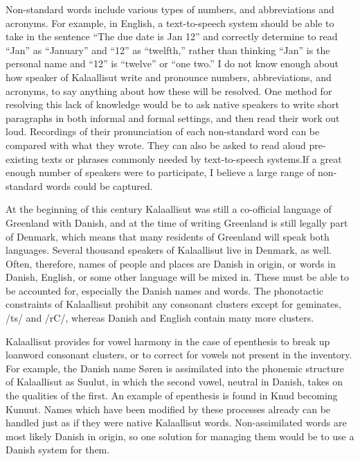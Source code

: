 \documentclass[12pt]{article}
\begin{document}
	Non-standard words include various types of numbers, and abbreviations and acronyms. For example, in English, a text-to-speech system should be able to take in the sentence ``The due date is Jan 12'' and correctly determine to read ``Jan'' as ``January'' and ``12'' as ``twelfth,'' rather than thinking ``Jan'' is the personal name and ``12'' is ``twelve'' or ``one two.'' I do not know enough about how speaker of Kalaallisut write and pronounce numbers, abbreviations, and acronyms, to say anything about how these will be resolved. One method for resolving this lack of knowledge would be to ask native speakers to write short paragraphs in both informal and formal settings, and then read their work out loud. Recordings of their pronunciation of each non-standard word can be compared with what they wrote. They can also be asked to read aloud pre-existing texts or phrases commonly needed by text-to-speech systems.If a great enough number of speakers were to participate, I believe a large range of non-standard words could be captured. \par

	At the beginning of this century Kalaallisut was still a co-official language of Greenland with Danish, and at the time of writing Greenland is still legally part of Denmark, which means that many residents of Greenland will speak both languages. Several thousand speakers of Kalaallisut live in Denmark, as well. Often, therefore, names of people and places are Danish in origin, or words in Danish, English, or some other language will be mixed in. These must be able to be accounted for, especially the Danish names and words. The phonotactic constraints of Kalaallisut prohibit any consonant clusters except for geminates, /ts/ and /rC/, whereas Danish and English contain many more clusters. \par

	Kalaallisut provides for vowel harmony in the case of epenthesis to break up loanword consonant clusters, or to correct for vowels not present in the inventory. For example, the Danish name S\o ren is assimilated into the phonemic structure of Kalaallisut as Suulut, in which the second vowel, neutral in Danish, takes on the qualities of the first. An example of epenthesis is found in Knud becoming Kunuut. Names which have been modified by these processes already can be handled just as if they were native Kalaallisut words. Non-assimilated words are most likely Danish in origin, so one solution for managing them would be to use a Danish system for them. \par
\end{document}
